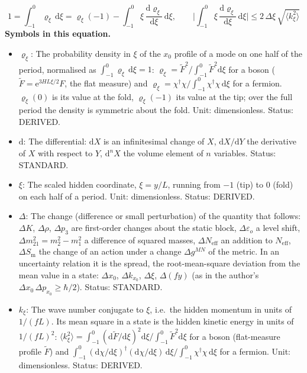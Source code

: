\documentclass[
  10pt,
]{article}
\providecommand{\tightlist}{%
  \setlength{\itemsep}{0pt}\setlength{\parskip}{0pt}}
\begin{document}
\[ 1 = \int_{-1}^{0}\varrho_\xi\,\mathrm{d}\xi = \varrho_\xi(-1) - \int_{-1}^{0}\xi\,\frac{\mathrm{d}\varrho_\xi}{\mathrm{d}\xi}\,\mathrm{d}\xi,\qquad \Big\lvert\int_{-1}^{0}\xi\,\frac{\mathrm{d}\varrho_\xi}{\mathrm{d}\xi}\,\mathrm{d}\xi\Big\rvert \le 2\,\Delta\xi\,\sqrt{\langle k_\xi^2\rangle} \]
\textbf{Symbols in this equation.}

\begin{itemize}
\tightlist
\item
  \(\varrho_\xi\): The probability density in \(\xi\) of the \(x_0\)
  profile of a mode on one half of the period, normalised as
  \(\int_{-1}^{0}\varrho_\xi\,\mathrm{d}\xi = 1\):
  \(\varrho_\xi = \tilde F^2/\int_{-1}^{0}\tilde F^2\mathrm{d}\xi\) for
  a boson (\(\tilde F = \mathrm{e}^{3HL\xi/2}F\), the flat measure) and
  \(\varrho_\xi = \chi^\dagger\chi/\int_{-1}^{0}\chi^\dagger\chi\,\mathrm{d}\xi\)
  for a fermion. \(\varrho_\xi(0)\) is its value at the fold,
  \(\varrho_\xi(-1)\) its value at the tip; over the full period the
  density is symmetric about the fold. Unit: dimensionless. Status:
  DERIVED.
\item
  \(\mathrm{d}\): The differential: \(\mathrm{d}X\) is an infinitesimal
  change of \(X\), \(\mathrm{d}X/\mathrm{d}Y\) the derivative of \(X\)
  with respect to \(Y\), \(\mathrm{d}^nX\) the volume element of \(n\)
  variables. Status: STANDARD.
\item
  \(\xi\): The scaled hidden coordinate, \(\xi = y/L\), running from
  \(-1\) (tip) to \(0\) (fold) on each half of a period. Unit:
  dimensionless. Status: DERIVED.
\item
  \(\Delta\): The change (difference or small perturbation) of the
  quantity that follows: \(\Delta K\), \(\Delta\rho\), \(\Delta p_3\)
  are first-order changes about the static block,
  \(\Delta\varepsilon_o\) a level shift,
  \(\Delta m^2_{21} = m_2^2 - m_1^2\) a difference of squared masses,
  \(\Delta N_{\mathrm{eff}}\) an addition to \(N_{\mathrm{eff}}\),
  \(\Delta S_{\mathrm{m}}\) the change of an action under a change
  \(\Delta g^{MN}\) of the metric. In an uncertainty relation it is the
  spread, the root-mean-square deviation from the mean value in a state:
  \(\Delta x_0\), \(\Delta k_{x_0}\), \(\Delta\xi\), \(\Delta(fy)\) (as
  in the author's \(\Delta x_0\,\Delta p_{x_0} \ge \hbar/2\)). Status:
  STANDARD.
\item
  \(k_\xi\): The wave number conjugate to \(\xi\), i.e.~the hidden
  momentum in units of \(1/(fL)\). Its mean square in a state is the
  hidden kinetic energy in units of \(1/(fL)^2\):
  \(\langle k_\xi^2\rangle = \int_{-1}^{0}(\mathrm{d}\tilde F/\mathrm{d}\xi)^2\mathrm{d}\xi\big/\int_{-1}^{0}\tilde F^2\mathrm{d}\xi\)
  for a boson (flat-measure profile \(\tilde F\)) and
  \(\int_{-1}^{0}(\mathrm{d}\chi/\mathrm{d}\xi)^\dagger(\mathrm{d}\chi/\mathrm{d}\xi)\,\mathrm{d}\xi\big/\int_{-1}^{0}\chi^\dagger\chi\,\mathrm{d}\xi\)
  for a fermion. Unit: dimensionless. Status: DERIVED.
\end{itemize}
\end{document}
